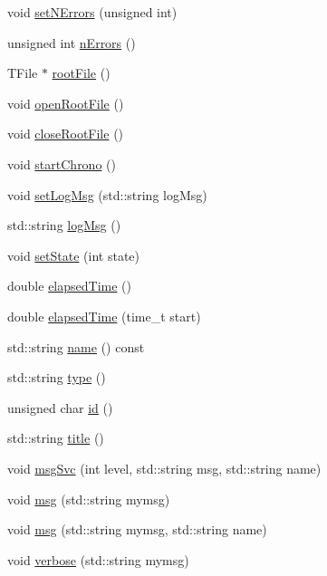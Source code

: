 \begin{DoxyCompactItemize}
\item 
void \hyperlink{classProcessus_a831b027b9cf18ab56fa6147b5d3055da}{setNErrors} (unsigned int)
\item 
unsigned int \hyperlink{classProcessus_a82a0487f82f07cc2c2dc2731f98149e7}{nErrors} ()
\item 
TFile $\ast$ \hyperlink{classProcessus_a247e8c362ec08422cf53d08dd23b093c}{rootFile} ()
\item 
void \hyperlink{classProcessus_aacf6812880c1d1a2bf14a4a39458f443}{openRootFile} ()
\item 
void \hyperlink{classProcessus_a2f3c41e99da4c738ea3d8f7b0d20a665}{closeRootFile} ()
\item 
void \hyperlink{classProcessus_a5e4d34b86241fa0756e07375a14ff4b2}{startChrono} ()
\item 
void \hyperlink{classProcessus_a471833f89047aa9a7ff6200a31c17a1d}{setLogMsg} (std::string logMsg)
\item 
std::string \hyperlink{classProcessus_a42fdeb17dc13ba854222666b6aa29b61}{logMsg} ()
\item 
void \hyperlink{classProcessus_ad38cde0f1bcefa00b068e7947b8af927}{setState} (int state)
\item 
double \hyperlink{classProcessus_aecca96218c65bc805c988cd95447df55}{elapsedTime} ()
\item 
double \hyperlink{classProcessus_a06d3815ad56593dfd0d3c1f534f8b146}{elapsedTime} (time\_\-t start)
\item 
std::string \hyperlink{classObject_a975e888d50bfcbffda2c86368332a5cd}{name} () const 
\item 
std::string \hyperlink{classObject_a84f99f70f144a83e1582d1d0f84e4e62}{type} ()
\item 
unsigned char \hyperlink{classObject_af99145335cc61ff6e2798ea17db009d2}{id} ()
\item 
std::string \hyperlink{classObject_a73a0f1a41828fdd8303dd662446fb6c3}{title} ()
\item 
void \hyperlink{classObject_a3f9d5537ebce0c0f2bf6ae4d92426f3c}{msgSvc} (int level, std::string msg, std::string name)
\item 
void \hyperlink{classObject_a58b2d0618c2d08cf2383012611528d97}{msg} (std::string mymsg)
\item 
void \hyperlink{classObject_ac5d59299273cee27aacf7de00d2e7034}{msg} (std::string mymsg, std::string name)
\item 
void \hyperlink{classObject_a83d2db2df682907ea1115ad721c1c4a1}{verbose} (std::string mymsg)
\item 

\end{DoxyCompactItemize}
